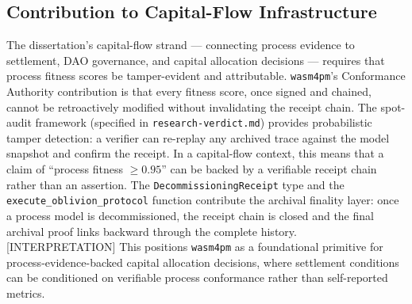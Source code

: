\subsection{Contribution to Capital-Flow Infrastructure}
\label{sec:sources-wasm4pm-contrib-capital-flow}

The dissertation's capital-flow strand — connecting process evidence to settlement, DAO
governance, and capital allocation decisions — requires that process fitness scores be
tamper-evident and attributable. \texttt{wasm4pm}'s Conformance Authority contribution is that
every fitness score, once signed and chained, cannot be retroactively modified without invalidating
the receipt chain. The spot-audit framework (specified in \texttt{research-verdict.md}) provides
probabilistic tamper detection: a verifier can re-replay any archived trace against the model
snapshot and confirm the receipt. In a capital-flow context, this means that a claim of
``process fitness $\geq 0.95$'' can be backed by a verifiable receipt chain rather than an
assertion. The \texttt{DecommissioningReceipt} type and the \texttt{execute\_oblivion\_protocol}
function contribute the archival finality layer: once a process model is decommissioned, the
receipt chain is closed and the final archival proof links backward through the complete history.
[INTERPRETATION] This positions \texttt{wasm4pm} as a foundational primitive for
process-evidence-backed capital allocation decisions, where settlement conditions can be
conditioned on verifiable process conformance rather than self-reported metrics.
